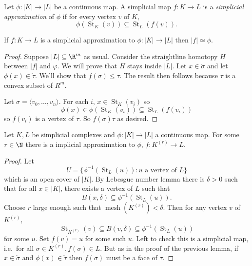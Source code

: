 \documentclass[a4paper]{article}
\newcommand{\interior}{\mathring} %
\DeclareMathOperator{\mesh}{mesh}
\DeclareMathOperator{\St}{St} %
\begin{document}
\begin{definition}
  Let \(\phi: |K| \to |L|\) be a continuous map. A simplicial map \(f: K \to L\) is a \emph{simplicial approximation} of \(\phi\) if for every vertex \(v\) of \(K\),
  \[
    \phi(\St_K(v)) \subseteq \St_L(f(v)).
  \]
\end{definition}

\begin{lemma}
  If \(f: K \to L\) is a simplicial approximation to \(\phi: |K| \to |L|\) then \(|f| \simeq \phi\).
\end{lemma}

\begin{proof}
  Suppose \(|L| \subseteq \R^m\) as usual. Consider the straightline homotopy \(H\) between \(|f|\) and \(\varphi\). We will prove that \(H\) stays inside \(|L|\). Let \(x \in \interior \sigma\) and let \(\phi(x) \in \interior \tau\). We'll show that \(f(\sigma) \leq \tau\). The result then follows because \(\tau\) is a convex subset of \(R^m\).

  Let \(\sigma = \langle v_0, \dots, v_n \rangle\). For each \(i\), \(x \in \St_K(v_i)\) so
  \[
    \phi(x) \in \phi(\St_K(v_i)) \subseteq \St_L(f(v_i))
  \]
  so \(f(v_i)\) is a vertex of \(\tau\). So \(f(\sigma) \tau\) as desired.
\end{proof}

\begin{theorem}
  Let \(K, L\) be simplicial complexes and \(\phi: |K| \to |L|\) a continuous map. For some \(r \in \N\) there is a implicial approximation to \(\phi\), \(f: K^{(r)} \to L\).
\end{theorem}

\begin{proof}
  Let
  \[
    U = \{\phi^{-1}(\St_L(u)): u \text{ a vertex of } L\}
  \]
  which is an open cover of \(|K|\). By Lebesgue number lemma there is \(\delta > 0\) such that for all \(x \in |K|\), there exists a vertex of \(L\) such that
  \[
    B(x, \delta) \subseteq \phi^{-1}(\St_L(u)).
  \]
  Choose \(r\) large enough such that \(\mesh(K^{(r)}) < \delta\). Then for any vertex \(v\) of \(K^{(r)}\),
  \[
    \St_{K^{(r)}}(v) \subseteq B(v, \delta) \subseteq \phi^{-1}(\St_L(u))
  \]
  for some \(u\). Set \(f(v) = u\) for some such \(u\). Left to check this is a simplicial map, i.e.\ for all \(\sigma \in K^{(r)}, f(\sigma) \in L\). But as in the proof of the previous lemma, if \(x \in \interior \sigma\) and \(\phi(x) \in \interior \tau\) then \(f(\sigma)\) must be a face of \(\tau\).
\end{proof}
\end{document}
